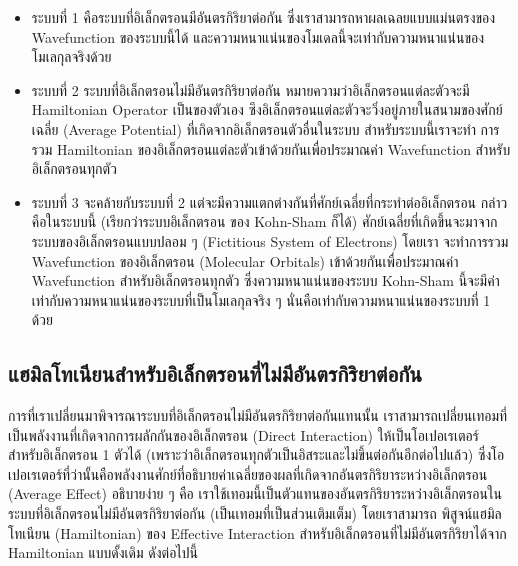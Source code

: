 \begin{itemize}[topsep=0pt]
    \item ระบบที่ 1 คือระบบที่อิเล็กตรอนมีอันตรกิริยาต่อกัน ซึ่งเราสามารถหาผลเฉลยแบบแม่นตรงของ Wavefunction ของระบบนี้ได้
          และความหนาแน่นของโมเดลนี้จะเท่ากับความหนาแน่นของโมเลกุลจริงด้วย

    \item ระบบที่ 2 ระบบที่อิเล็กตรอนไม่มีอันตรกิริยาต่อกัน หมายความว่าอิเล็กตรอนแต่ละตัวจะมี Hamiltonian Operator เป็นของตัวเอง
          ซึงอิเล็กตรอนแต่ละตัวจะวิ่งอยู่ภายในสนามของศักย์เฉลี่ย (Average Potential) ที่เกิดจากอิเล็กตรอนตัวอื่นในระบบ สำหรับระบบนี้เราจะทำ%
          การรวม Hamiltonian ของอิเล็กตรอนแต่ละตัวเข้าด้วยกันเพื่อประมาณค่า Wavefunction สำหรับอิเล็กตรอนทุกตัว

    \item ระบบที่ 3 จะคล้ายกับระบบที่ 2 แต่จะมีความแตกต่างกันที่ศักย์เฉลี่ยที่กระทำต่ออิเล็กตรอน กล่าวคือในระบบนี้ (เรียกว่าระบบอิเล็กตรอน
          ของ Kohn-Sham ก็ได้) ศักย์เฉลี่ยที่เกิดขึ้นจะมาจากระบบของอิเล็กตรอนแบบปลอม ๆ (Fictitious System of Electrons) โดยเรา%
          จะทำการรวม Wavefunction ของอิเล็กตรอน (Molecular Orbitals) เข้าด้วยกันเพื่อประมาณค่า Wavefunction สำหรับอิเล็กตรอนทุกตัว
          ซึ่งความหนาแน่นของระบบ Kohn-Sham นี้จะมีค่าเท่ากับความหนาแน่นของระบบที่เป็นโมเลกุลจริง ๆ นั่นคือเท่ากับความหนาแน่นของระบบที่ 1
          ด้วย
\end{itemize}

\subsection{แฮมิลโทเนียนสำหรับอิเล็กตรอนที่ไม่มีอันตรกิริยาต่อกัน}
\label{ssec:hamil_noninter_elec}

การที่เราเปลี่ยนมาพิจารณาระบบที่อิเล็กตรอนไม่มีอันตรกิริยาต่อกันแทนนั้น เราสามารถเปลี่ยนเทอมที่เป็นพลังงานที่เกิดจากการผลักกันของอิเล็กตรอน
(Direct Interaction) ให้เป็นโอเปอเรเตอร์สำหรับอิเล็กตรอน 1 ตัวได้ (เพราะว่าอิเล็กตรอนทุกตัวเป็นอิสระและไม่ขึ้นต่อกันอีกต่อไปแล้ว)
ซึ่งโอเปอเรเตอร์ที่ว่านั้นคือพลังงานศักย์ที่อธิบายค่าเฉลี่ยของผลที่เกิดจากอันตรกิริยาระหว่างอิเล็กตรอน (Average Effect) อธิบายง่าย ๆ คือ%
เราใช้เทอมนี้เป็นตัวแทนของอันตรกิริยาระหว่างอิเล็กตรอนในระบบที่อิเล็กตรอนไม่มีอันตรกิริยาต่อกัน (เป็นเทอมที่เป็นส่วนเติมเต็ม) โดยเราสามารถ%
พิสูจน์แฮมิลโทเนียน (Hamiltonian) ของ Effective Interaction สำหรับอิเล็กตรอนที่ไม่มีอันตรกิริยาได้จาก Hamiltonian แบบดั้งเดิม
ดังต่อไปนี้

